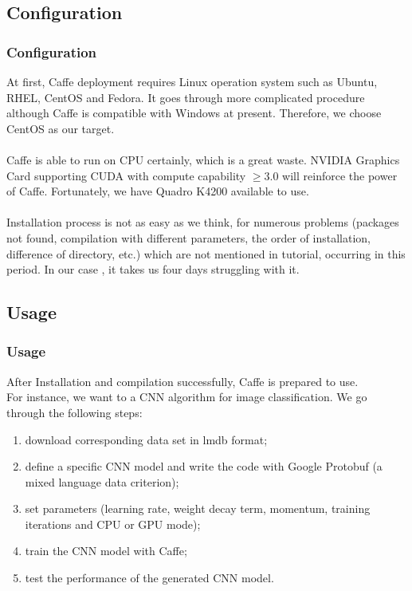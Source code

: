 \documentclass[10pt, mathserif]{beamer}	%
\newcommand{\ftitle}[1]{\frametitle{\hspace{4ex} {#1}}}	%
\begin{document}
\begin{CJK}{UTF8}{song}
\subsection{Configuration}
\begin{frame}
	\ftitle{Configuration}
	At first, Caffe deployment requires Linux operation system such as Ubuntu, RHEL, CentOS and Fedora. It goes through more complicated procedure although Caffe is compatible with Windows at present. Therefore, we choose {\color{red} CentOS} as our target.\\
	~\\
	Caffe is able to run on CPU certainly, which is a great waste. NVIDIA Graphics Card supporting CUDA with compute capability $\geqslant 3.0$ will reinforce the power of Caffe. Fortunately, we have {\color{red} Quadro K4200} available to use.\\
	~\\
	Installation process is not as easy as we think, for numerous problems (packages not found,  compilation with different parameters, the order of installation, difference of directory, etc.) which are not mentioned in tutorial, occurring in this period. In our case , it takes us {\color{red}four days} struggling with it.
\end{frame}

\subsection{Usage}
\begin{frame}
	\ftitle{Usage}
	After Installation and compilation successfully, Caffe is prepared to use.\\
	For instance, we want to a CNN algorithm for image classification. We go through the following steps:
	\begin{enumerate}
		\item download corresponding data set in lmdb format;
		\item define a specific CNN model and write the code with {\color{red} Google Protobuf} (a mixed language data criterion);
		\item set parameters (learning rate, weight decay term, momentum, training iterations and CPU or GPU mode);
		\item train the CNN model with Caffe;
		\item test the performance of the generated CNN model.
	\end{enumerate}
\end{frame}


\end{CJK}
\end{document}

